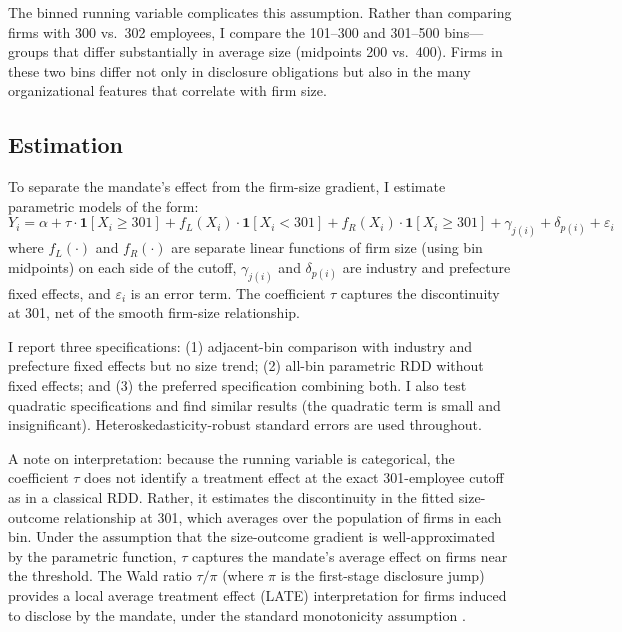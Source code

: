\documentclass[12pt]{article}
\begin{document}
The binned running variable complicates this assumption. Rather than comparing firms with 300 vs.\ 302 employees, I compare the 101--300 and 301--500 bins---groups that differ substantially in average size (midpoints 200 vs.\ 400). Firms in these two bins differ not only in disclosure obligations but also in the many organizational features that correlate with firm size.

\subsection{Estimation}

To separate the mandate's effect from the firm-size gradient, I estimate parametric models of the form:
\begin{equation}
Y_i = \alpha + \tau \cdot \mathbf{1}[X_i \geq 301] + f_L(X_i) \cdot \mathbf{1}[X_i < 301] + f_R(X_i) \cdot \mathbf{1}[X_i \geq 301] + \gamma_{j(i)} + \delta_{p(i)} + \varepsilon_i
\label{eq:main}
\end{equation}
where $f_L(\cdot)$ and $f_R(\cdot)$ are separate linear functions of firm size (using bin midpoints) on each side of the cutoff, $\gamma_{j(i)}$ and $\delta_{p(i)}$ are industry and prefecture fixed effects, and $\varepsilon_i$ is an error term. The coefficient $\tau$ captures the discontinuity at 301, net of the smooth firm-size relationship.

I report three specifications: (1) adjacent-bin comparison with industry and prefecture fixed effects but no size trend; (2) all-bin parametric RDD without fixed effects; and (3) the preferred specification combining both. I also test quadratic specifications and find similar results (the quadratic term is small and insignificant). Heteroskedasticity-robust standard errors are used throughout.

A note on interpretation: because the running variable is categorical, the coefficient $\tau$ does not identify a treatment effect at the exact 301-employee cutoff as in a classical RDD. Rather, it estimates the discontinuity in the fitted size-outcome relationship at 301, which averages over the population of firms in each bin. Under the assumption that the size-outcome gradient is well-approximated by the parametric function, $\tau$ captures the mandate's average effect on firms near the threshold. The Wald ratio $\tau / \pi$ (where $\pi$ is the first-stage disclosure jump) provides a local average treatment effect (LATE) interpretation for firms induced to disclose by the mandate, under the standard monotonicity assumption \citep{hahn2001}.
\end{document}
